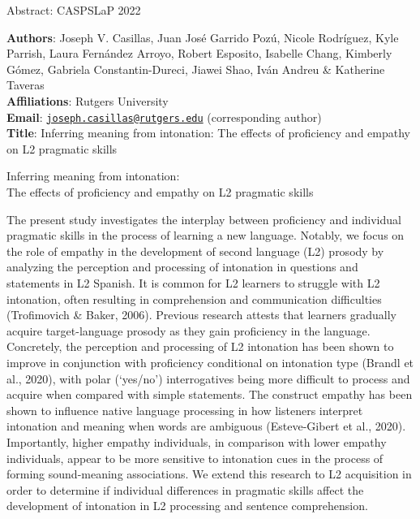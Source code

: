 \documentclass[
  12pt,
]{article}
\author{}
\date{\vspace{-2.5em}}
\begin{document}
\begin{center}
Abstract: CASPSLaP 2022
\end{center}

\textbf{Authors}: Joseph V. Casillas, Juan José Garrido Pozú, Nicole
Rodríguez, Kyle Parrish, Laura Fernández Arroyo, Robert Esposito,
Isabelle Chang, Kimberly Gómez, Gabriela Constantin-Dureci, Jiawei Shao,
Iván Andreu \& Katherine Taveras\\
\textbf{Affiliations}: Rutgers University\\
\textbf{Email}:
\href{mailto:joseph.casillas@rutgers.edu}{\nolinkurl{joseph.casillas@rutgers.edu}}
(corresponding author)\\
\textbf{Title}: Inferring meaning from intonation: The effects of
proficiency and empathy on L2 pragmatic skills

\clearpage

\begin{center}
{\large Inferring meaning from intonation: \\
The effects of proficiency and empathy on L2 pragmatic skills}
\end{center}

The present study investigates the interplay between proficiency and
individual pragmatic skills in the process of learning a new language.
Notably, we focus on the role of empathy in the development of second
language (L2) prosody by analyzing the perception and processing of
intonation in questions and statements in L2 Spanish. It is common for
L2 learners to struggle with L2 intonation, often resulting in
comprehension and communication difficulties (Trofimovich \& Baker,
2006). Previous research attests that learners gradually acquire
target-language prosody as they gain proficiency in the language.
Concretely, the perception and processing of L2 intonation has been
shown to improve in conjunction with proficiency conditional on
intonation type (Brandl et al., 2020), with polar (`yes/no')
interrogatives being more difficult to process and acquire when compared
with simple statements. The construct empathy has been shown to
influence native language processing in how listeners interpret
intonation and meaning when words are ambiguous (Esteve-Gibert et al.,
2020). Importantly, higher empathy individuals, in comparison with lower
empathy individuals, appear to be more sensitive to intonation cues in
the process of forming sound-meaning associations. We extend this
research to L2 acquisition in order to determine if individual
differences in pragmatic skills affect the development of intonation in
L2 processing and sentence comprehension.
\end{document}
